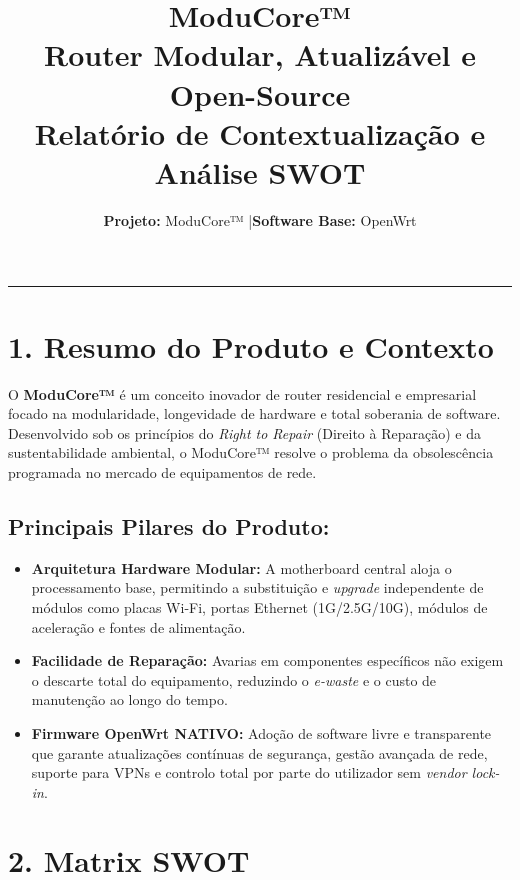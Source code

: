 \documentclass[11pt, a4paper]{article}
\title{
    \vspace{-1.5cm}
    \textsf{\textbf{\Huge \color{brandblue} ModuCore™}}\\[0.2cm]
    \Large \textsf{Router Modular, Atualizável e Open-Source}\\[0.1cm]
    \large \textsf{Relatório de Contextualização e Análise SWOT}
    \vspace{-0.3cm}
}
\author{\textbf{Projeto:} ModuCore™ \quad|\quad \textbf{Software Base:} OpenWrt}
\date{}
\begin{document}
\maketitle

\vspace{-0.4cm}
\begin{center}
    \color{subtlebar}\rule{\linewidth}{1pt}
\end{center}
\vspace{0.2cm}

\section*{1. Resumo do Produto e Contexto}

O \textbf{ModuCore™} é um conceito inovador de router residencial e empresarial focado na modularidade, longevidade de hardware e total soberania de software. Desenvolvido sob os princípios do \textit{Right to Repair} (Direito à Reparação) e da sustentabilidade ambiental, o ModuCore™ resolve o problema da obsolescência programada no mercado de equipamentos de rede.

\subsection*{Principais Pilares do Produto:}
\begin{itemize}[leftmargin=*, noitemsep, topsep=3pt]
    \item \textbf{Arquitetura Hardware Modular:} A motherboard central aloja o processamento base, permitindo a substituição e \textit{upgrade} independente de módulos como placas Wi-Fi, portas Ethernet (1G/2.5G/10G), módulos de aceleração e fontes de alimentação.
    \item \textbf{Facilidade de Reparação:} Avarias em componentes específicos não exigem o descarte total do equipamento, reduzindo o \textit{e-waste} e o custo de manutenção ao longo do tempo.
    \item \textbf{Firmware OpenWrt NATIVO:} Adoção de software livre e transparente que garante atualizações contínuas de segurança, gestão avançada de rede, suporte para VPNs e controlo total por parte do utilizador sem \textit{vendor lock-in}.
\end{itemize}

\vspace{0.3cm}

\newpage
\section*{2. Matrix SWOT}
\end{document}

